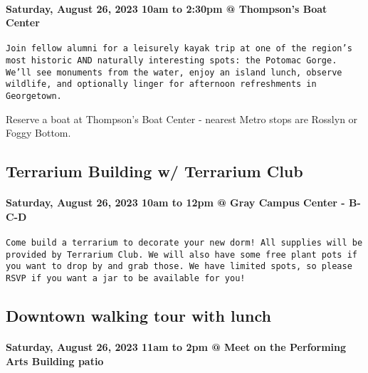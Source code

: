 \documentclass[
]{article}
\begin{document}
\hypertarget{saturday-august-26-2023-10am-to-230pm-thompsons-boat-center}{%
\paragraph{Saturday, August 26, 2023 10am to 2:30pm @ Thompson's Boat
Center}\label{saturday-august-26-2023-10am-to-230pm-thompsons-boat-center}}

\begin{verbatim}
Join fellow alumni for a leisurely kayak trip at one of the region’s most historic AND naturally interesting spots: the Potomac Gorge. We’ll see monuments from the water, enjoy an island lunch, observe wildlife, and optionally linger for afternoon refreshments in Georgetown.
\end{verbatim}

Reserve a boat at Thompson's Boat Center - nearest Metro stops are
Rosslyn or Foggy Bottom.

\hypertarget{terrarium-building-w-terrarium-club}{%
\subsection{Terrarium Building w/ Terrarium
Club}\label{terrarium-building-w-terrarium-club}}

\hypertarget{saturday-august-26-2023-10am-to-12pm-gray-campus-center---b-c-d}{%
\paragraph{Saturday, August 26, 2023 10am to 12pm @ Gray Campus Center -
B-C-D}\label{saturday-august-26-2023-10am-to-12pm-gray-campus-center---b-c-d}}

\begin{verbatim}
Come build a terrarium to decorate your new dorm! All supplies will be provided by Terrarium Club. We will also have some free plant pots if you want to drop by and grab those. We have limited spots, so please RSVP if you want a jar to be available for you!
\end{verbatim}

\hypertarget{downtown-walking-tour-with-lunch}{%
\subsection{Downtown walking tour with
lunch}\label{downtown-walking-tour-with-lunch}}

\hypertarget{saturday-august-26-2023-11am-to-2pm-meet-on-the-performing-arts-building-patio}{%
\paragraph{Saturday, August 26, 2023 11am to 2pm @ Meet on the
Performing Arts Building
patio}\label{saturday-august-26-2023-11am-to-2pm-meet-on-the-performing-arts-building-patio}}
\end{document}
